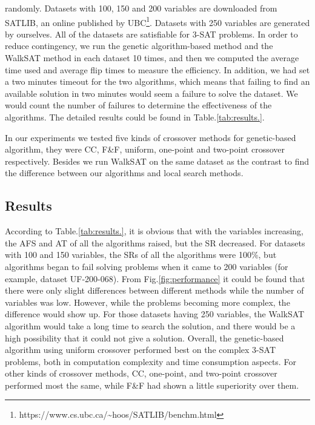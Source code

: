randomly. Datasets with 100, 150 and 200 variables are downloaded from SATLIB,
an online published by UBC\footnote{https://www.cs.ubc.ca/\textasciitilde hoos/SATLIB/benchm.html}. Datasets with 250 variables
are generated by ourselves. All of the datasets are satisfiable for 3-SAT
problems. In order to reduce contingency, we run the genetic algorithm-based
method and the WalkSAT method in each dataset 10 times, and then we computed
the average time used and average flip times to measure the efficiency. In
addition, we had set a two minutes timeout for the two algorithms, which means
that failing to find an available solution in two minutes would seem a failure
to solve the dataset. We would count the number of failures to determine the
effectiveness of the algorithms. The detailed results could be found in
Table.\ref{tab:results.}.

In our experiments we tested five kinds of crossover methods for genetic-based
algorithm, they were CC, F\&F, uniform, one-point and two-point crossover
respectively. Besides we run WalkSAT on the same dataset as the contrast to
find the difference between our algorithms and local search methods.

\subsection{Results}

According to Table.\ref{tab:results.}, it is obvious that with the
variables increasing, the AFS and AT of all the algorithms raised, but the SR
decreased. For datasets with 100 and 150 variables, the SRs of all the
algorithms were 100\%, but algorithms began to fail solving problems when it
came to 200 variables (for example, dataset UF-200-068). From
Fig.\ref{fig:performance} it could be found that there were only slight
differences between different methods while the number of variables was low.
However, while the problems becoming more complex, the difference would show
up. For those datasets having 250 variables, the WalkSAT algorithm would take
a long time to search the solution, and there would be a high possibility that
it could not give a solution. Overall, the genetic-based algorithm using
uniform crossover performed best on the complex 3-SAT problems, both in
computation complexity and time consumption aspects. For other kinds of
crossover methods, CC, one-point, and two-point crossover performed most the
same, while F\&F had shown a little superiority over them.
